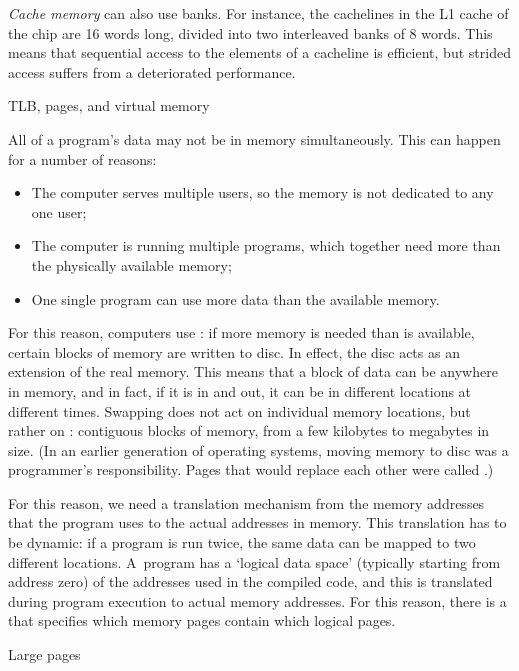 \emph{Cache memory} can also use banks. For instance, the
cachelines in the L1 cache of the  chip
are 16 words long, divided into two interleaved banks of 8 words. This
means that sequential access to the elements of a cacheline is
efficient, but strided access suffers from a deteriorated performance.

 {TLB, pages, and virtual memory}
\label{sec:smallpage}

All of a program's data may not be in memory simultaneously. This can
happen for a number of reasons:
\begin{itemize}
\item The computer serves multiple users, so the memory is not
  dedicated to any one user;
\item The computer is running multiple programs, which together need
  more than the physically available memory;
\item One single program can use more data than the available memory.
\end{itemize}
For this reason, computers use : if more
memory is needed than is available, certain blocks of memory are
written to disc. In effect, the disc acts as an extension of the real
memory. This means that a block of data can be anywhere in memory, and
in fact, if it is  in and out, it can be in
different locations at different times. Swapping does not act on
individual memory locations, but rather on :
contiguous blocks of memory, from a few kilobytes to megabytes in size.
(In an earlier generation of operating systems, moving memory to disc
was a programmer's responsibility. Pages that would replace each other
were called .)

For this reason, we need a translation mechanism from the memory
addresses that the program uses to the actual addresses in memory.
This translation has to be dynamic: if a program is run twice,
the same data can be mapped to two different locations.
A~program has a `logical data
space' (typically starting from address zero) of the addresses used in
the compiled code, and this is translated during program
execution to actual memory addresses. For this reason, there is a
 that specifies which memory pages contain which
logical pages.

 {Large pages}

